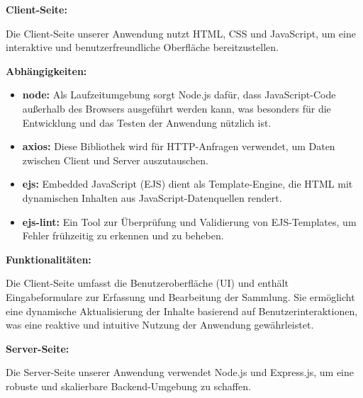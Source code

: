 \textbf{Client-Seite:}

Die Client-Seite unserer Anwendung nutzt HTML, CSS und JavaScript, um eine interaktive und benutzerfreundliche Oberfläche bereitzustellen.

\textbf{Abhängigkeiten:}
    \begin{itemize}
        \item \textbf{node:} Als Laufzeitumgebung sorgt Node.js dafür, dass JavaScript-Code außerhalb des Browsers ausgeführt werden kann, was besonders für die Entwicklung und das Testen der Anwendung nützlich ist.
        \item \textbf{axios:} Diese Bibliothek wird für HTTP-Anfragen verwendet, um Daten zwischen Client und Server auszutauschen.
        \item \textbf{ejs:} Embedded JavaScript (EJS) dient als Template-Engine, die HTML mit dynamischen Inhalten aus JavaScript-Datenquellen rendert.
        \item \textbf{ejs-lint:} Ein Tool zur Überprüfung und Validierung von EJS-Templates, um Fehler frühzeitig zu erkennen und zu beheben.
    \end{itemize}
\item \textbf{Funktionalitäten:}

Die Client-Seite umfasst die Benutzeroberfläche (UI) und enthält Eingabeformulare zur Erfassung und Bearbeitung der Sammlung. Sie ermöglicht eine dynamische Aktualisierung der Inhalte basierend auf Benutzerinteraktionen, was eine reaktive und intuitive Nutzung der Anwendung gewährleistet.


\textbf{Server-Seite:}

Die Server-Seite unserer Anwendung verwendet Node.js und Express.js, um eine robuste und skalierbare Backend-Umgebung zu schaffen.


